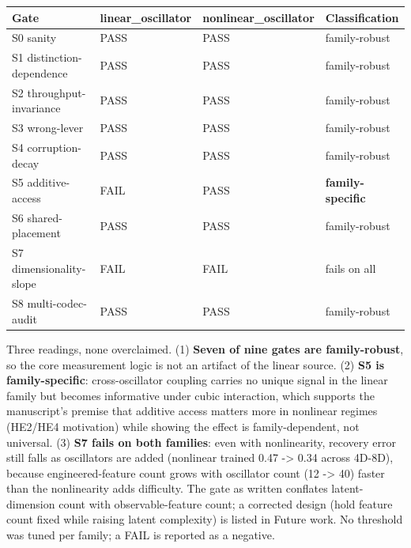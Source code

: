 \documentclass[
  11pt,
]{article}
\newcounter{none} %
\begin{document}
{\def\LTcaptype{none} %
\begin{longtable}[]{@{}
  >{\raggedright\arraybackslash}p{}
  >{\raggedright\arraybackslash}p{}
  >{\raggedright\arraybackslash}p{}
  >{\raggedright\arraybackslash}p{}@{}}
\toprule\noalign{}
\begin{minipage}[b]{\linewidth}\raggedright
Gate
\end{minipage} &
\begin{minipage}[b]{\linewidth}\raggedright
linear\_oscillator
\end{minipage} &
\begin{minipage}[b]{\linewidth}\raggedright
nonlinear\_oscillator
\end{minipage} &
\begin{minipage}[b]{\linewidth}\raggedright
Classification
\end{minipage} \\
\midrule\noalign{}
\endhead
\bottomrule\noalign{}
\endlastfoot
S0 sanity & PASS & PASS & family-robust \\
S1 distinction-dependence & PASS & PASS &
family-robust \\
S2 throughput-invariance & PASS & PASS &
family-robust \\
S3 wrong-lever & PASS & PASS & family-robust \\
S4 corruption-decay & PASS & PASS & family-robust \\
S5 additive-access & FAIL & PASS &
\textbf{family-specific} \\
S6 shared-placement & PASS & PASS & family-robust \\
S7 dimensionality-slope & FAIL & FAIL & fails on all \\
S8 multi-codec-audit & PASS & PASS & family-robust \\
\end{longtable}
}

Three readings, none overclaimed. (1) \textbf{Seven of
nine gates are family-robust}, so the core measurement
logic is not an artifact of the linear source. (2)
\textbf{S5 is family-specific}: cross-oscillator
coupling carries no unique signal in the linear family
but becomes informative under cubic interaction, which
supports the manuscript's premise that additive access
matters more in nonlinear regimes (HE2/HE4 motivation)
while showing the effect is family-dependent, not
universal. (3) \textbf{S7 fails on both families}: even
with nonlinearity, recovery error still falls as
oscillators are added (nonlinear trained 0.47
-\textgreater{} 0.34 across 4D-8D), because
engineered-feature count grows with oscillator count
(12 -\textgreater{} 40) faster than the nonlinearity
adds difficulty. The gate as written conflates
latent-dimension count with observable-feature count; a
corrected design (hold feature count fixed while
raising latent complexity) is listed in Future work. No
threshold was tuned per family; a FAIL is reported as a
negative.
\end{document}
